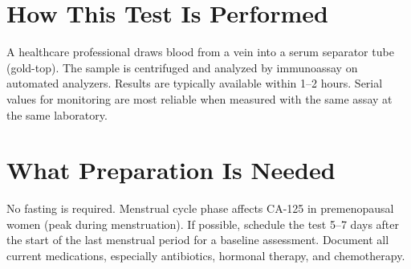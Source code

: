 \section*{How This Test Is Performed}
A healthcare professional draws blood from a vein into a serum separator tube (gold-top). The sample is centrifuged and analyzed by immunoassay on automated analyzers. Results are typically available within 1--2 hours. Serial values for monitoring are most reliable when measured with the same assay at the same laboratory.

\section*{What Preparation Is Needed}
No fasting is required. Menstrual cycle phase affects CA-125 in premenopausal women (peak during menstruation). If possible, schedule the test 5--7 days after the start of the last menstrual period for a baseline assessment. Document all current medications, especially antibiotics, hormonal therapy, and chemotherapy.

